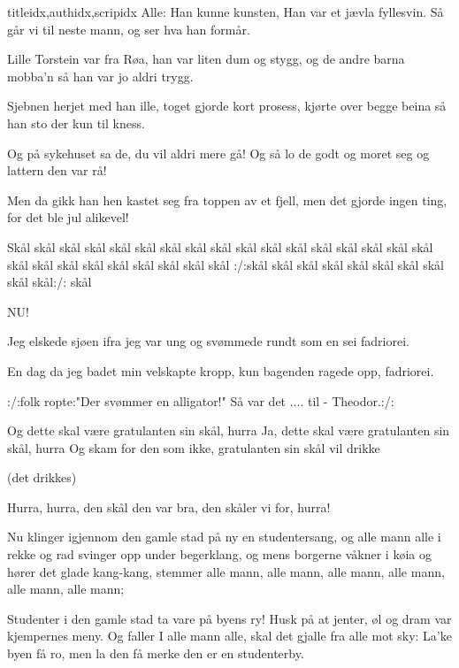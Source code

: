 \documentclass[14pt,letterpaper,norsk]{article}
\begin{document}
\begin{songs}{titleidx,authidx,scripidx}
\beginverse
Alle: Han kunne kunsten,
Han var et jævla fyllesvin.
Så går vi til neste mann, og
ser hva han formår.
\endverse
\endsong


\beginverse
Lille Torstein var fra Røa,
han var liten dum og stygg,
og de andre barna mobba'n så
han var jo aldri trygg.
\endverse

\beginverse
Sjebnen herjet med han ille,
toget gjorde kort prosess,
kjørte over begge beina
så han sto der kun til kness.
\endverse

\beginverse
Og på sykehuset sa de,
du vil aldri mere gå!
Og så lo de godt og moret seg
og lattern den var rå!
\endverse

\beginverse
Men da gikk han hen kastet seg
fra toppen av et fjell,
men det gjorde ingen ting,
for det ble jul alikevel!
\endverse
\endsong

\beginverse
Skål skål skål skål skål skål skål
skål skål skål skål skål skål
skål skål skål skål skål skål skål
skål skål skål skål skål skål
:/:skål skål skål skål
skål skål skål skål skål skål:/:
skål
\endverse
\endsong

\beginverse
NU!
\endverse
\endsong

\beginverse
Jeg elskede sjøen ifra jeg var ung
og svømmede rundt som en sei
fadriorei.
\endverse

\beginverse
En dag da jeg badet min velskapte kropp,
kun bagenden ragede opp,
fadriorei.
\endverse

\beginverse
:/:folk ropte:"Der svømmer en alligator!"
Så var det .... til - Theodor.:/:
\endverse
\endsong

\beginverse
Og dette skal være gratulanten sin skål, hurra
Ja, dette skal være gratulanten sin skål, hurra
Og skam for den som ikke, gratulanten sin skål vil drikke

(det drikkes)

Hurra, hurra, den skål den var bra, den skåler vi for, hurra!
\endverse
\endsong

\beginverse
Nu klinger igjennom den gamle stad på ny en studentersang,
og alle mann alle i rekke og rad svinger opp under begerklang,
og mens borgerne våkner i køia og hører det glade kang-kang,
stemmer alle mann, alle mann, alle mann, alle mann, alle mann, alle mann;
\endverse

\beginchorus
Studenter i den gamle stad ta vare på byens ry!
Husk på at jenter, øl og dram var kjempernes meny.
Og faller I alle mann alle, skal det gjalle fra alle mot sky:
La'ke byen få ro, men la den få merke den er en studenterby.
\endchorus


\end{songs}
\end{document}
